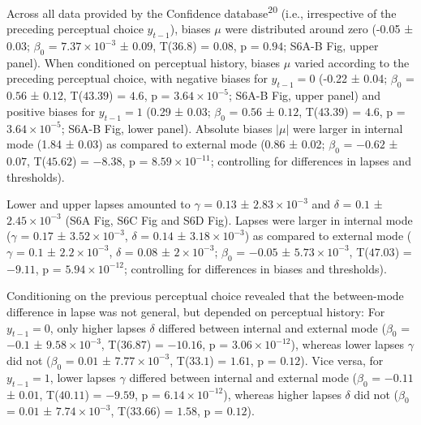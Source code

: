 \documentclass[
]{article}
\begin{document}
Across all data provided by the Confidence database\textsuperscript{20}
(i.e., irrespective of the preceding perceptual choice \(y_{t-1}\)),
biases \(\mu\) were distributed around zero (-0.05 ± 0.03; \(\beta_0\) =
\(\ensuremath{7.37\times 10^{-3}}\) ± \(0.09\), T(\(36.8\)) = \(0.08\),
p = \(0.94\); S6A-B Fig, upper panel). When conditioned
on perceptual history, biases \(\mu\) varied according to the preceding
perceptual choice, with negative biases for \(y_{t-1} = 0\) (-0.22 ±
0.04; \(\beta_0\) = \(0.56\) ± \(0.12\), T(\(43.39\)) = \(4.6\), p =
\(\ensuremath{3.64\times 10^{-5}}\); S6A-B Fig, upper
panel) and positive biases for \(y_{t-1} = 1\) (0.29 ± 0.03; \(\beta_0\)
= \(0.56\) ± \(0.12\), T(\(43.39\)) = \(4.6\), p =
\(\ensuremath{3.64\times 10^{-5}}\); S6A-B Fig, lower
panel). Absolute biases \(|\mu|\) were larger in internal mode (1.84 ±
0.03) as compared to external mode (0.86 ± 0.02; \(\beta_0\) = \(-0.62\)
± \(0.07\), T(\(45.62\)) = \(-8.38\), p =
\(\ensuremath{8.59\times 10^{-11}}\); controlling for differences in
lapses and thresholds).

Lower and upper lapses amounted to \(\gamma\) = \(0.13\) ±
\(\ensuremath{2.83\times 10^{-3}}\) and \(\delta\) = \(0.1\) ±
\(\ensuremath{2.45\times 10^{-3}}\) (S6A Fig, S6C Fig and S6D Fig).
Lapses were larger in internal mode (\(\gamma\) = \(0.17\) ±
\(\ensuremath{3.52\times 10^{-3}}\), \(\delta\) = \(0.14\) ±
\(\ensuremath{3.18\times 10^{-3}}\)) as compared to external mode
(\(\gamma\) = \(0.1\) ± \(\ensuremath{2.2\times 10^{-3}}\), \(\delta\) =
\(0.08\) ± \(\ensuremath{2\times 10^{-3}}\); \(\beta_0\) = \(-0.05\) ±
\(\ensuremath{5.73\times 10^{-3}}\), T(\(47.03\)) = \(-9.11\), p =
\(\ensuremath{5.94\times 10^{-12}}\); controlling for differences in
biases and thresholds).

Conditioning on the previous perceptual choice revealed that the
between-mode difference in lapse was not general, but depended on
perceptual history: For \(y_{t-1} = 0\), only higher lapses \(\delta\)
differed between internal and external mode (\(\beta_0\) = \(-0.1\) ±
\(\ensuremath{9.58\times 10^{-3}}\), T(\(36.87\)) = \(-10.16\), p =
\(\ensuremath{3.06\times 10^{-12}}\)), whereas lower lapses \(\gamma\)
did not (\(\beta_0\) = \(0.01\) ± \(\ensuremath{7.77\times 10^{-3}}\),
T(\(33.1\)) = \(1.61\), p = \(0.12\)). Vice versa, for \(y_{t-1} = 1\),
lower lapses \(\gamma\) differed between internal and external mode
(\(\beta_0\) = \(-0.11\) ± \(0.01\), T(\(40.11\)) = \(-9.59\), p =
\(\ensuremath{6.14\times 10^{-12}}\)), whereas higher lapses \(\delta\)
did not (\(\beta_0\) = \(0.01\) ± \(\ensuremath{7.74\times 10^{-3}}\),
T(\(33.66\)) = \(1.58\), p = \(0.12\)).
\end{document}
